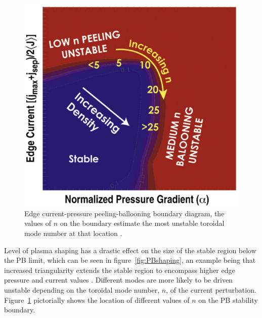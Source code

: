 \documentclass[11pt, twocolumn]{article}  %
\begin{document}
\begin{figure}
\includegraphics[scale=0.5]{Figures/PBmodenumbers.PNG}
\centering
\caption{Edge current-pressure peeling-ballooning boundary diagram, the values of $n$ on the boundary estimate the most unstable toroidal mode number at that location \cite{Wade2009}.}\label{fig:PBmodenumbers}
\end{figure}

Level of plasma shaping has a drastic effect on the size of the stable region below the PB limit, which can be seen in figure~\ref{fig:PBshaping}, an example being that increased triangularity extends the stable region to encompass higher edge pressure and current values \cite{Lang2013}. Different modes are more likely to be driven unstable depending on the toroidal mode number, $n$, of the current perturbation. Figure~\ref{fig:PBmodenumbers} pictorially shows the location of different values of $n$ on the PB stability boundary.
\end{document}
